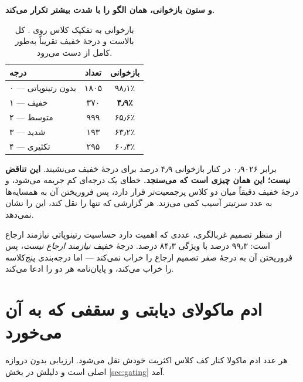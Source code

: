 \textbf{و ستون بازخوانی، همان الگو را با شدت بیشتر تکرار می‌کند.}

\begin{table}[H]
\caption{بازخوانی به تفکیک کلاس روی . کل  بالاست و درجهٔ خفیف تقریباً
به‌طور کامل از دست می‌رود.}
\centering
\begin{tabular}{|l|c|c|}
\hline
\textbf{درجه} & \textbf{تعداد} & \textbf{بازخوانی} \\ \hline
\num{۰} — بدون رتینوپاتی & \num{۱۸۰۵} & \num{۹۸٫۱}٪ \\ \hline
\num{۱} — خفیف & \num{۳۷۰} & \textbf{\num{۴٫۹}٪} \\ \hline
\num{۲} — متوسط & \num{۹۹۹} & \num{۶۵٫۶}٪ \\ \hline
\num{۳} — شدید & \num{۱۹۳} & \num{۶۳٫۲}٪ \\ \hline
\num{۴} — تکثیری & \num{۲۹۵} & \num{۶۰٫۳}٪ \\ \hline
\end{tabular}
\label{tab:external-recall}
\end{table}

 برابر \num{۰٫۹۰۲۶} در کنار بازخوانی \num{۴٫۹} درصد برای درجهٔ خفیف می‌نشیند. \textbf{این تناقض
نیست؛ این همان چیزی است که  می‌سنجد.} خطای یک درجه‌ای کم جریمه می‌شود، و درجهٔ خفیف
دقیقاً میان دو کلاس پرجمعیت‌تر قرار دارد، پس فروریختن آن به همسایه‌ها به عدد سرتیتر آسیب کمی
می‌زند. هر گزارشی که تنها  را نقل کند، این را نشان نمی‌دهد.

از منظر تصمیم غربالگری، عددی که اهمیت دارد حساسیت رتینوپاتی نیازمند ارجاع است: \num{۹۹٫۳} درصد با
ویژگی \num{۸۴٫۳} درصد. درجهٔ خفیف \emph{نیازمند ارجاع نیست}، پس فروریختن آن به درجهٔ صفر تصمیم ارجاع
را خراب نمی‌کند — اما درجه‌بندی پنج‌کلاسه را خراب می‌کند، و پایان‌نامه هر دو را ادعا می‌کند.

\section{ادم ماکولای دیابتی و سقفی که به آن می‌خورد}
\label{sec:dme}

هر عدد ادم ماکولا کنار کف کلاس اکثریت خودش نقل می‌شود. ارزیابی بدون دروازه اصلی است و
دلیلش در بخش \ref{sec:gating} آمد.

